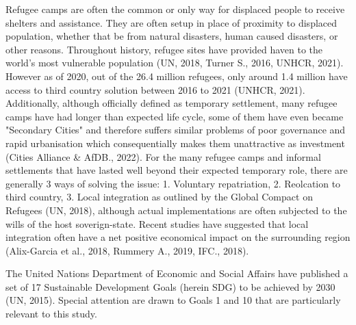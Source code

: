 \documentclass[11pt, a4paper, twoside]{report}
\begin{document}
Refugee camps are often the common or only way for displaced people to receive shelters and assistance. They are often setup in place of proximity to displaced population, whether that be from natural disasters, human caused disasters, or other reasons. Throughout history, refugee sites have provided haven to the world's most vulnerable population (UN, 2018, Turner S., 2016, UNHCR, 2021). However as of 2020, out of the 26.4 million refugees, only around 1.4 million have access to third country solution between 2016 to 2021 (UNHCR, 2021). Additionally, although officially defined as temporary settlement, many refugee camps have had longer than expected life cycle, some of them have even became "Secondary Cities" and therefore suffers similar problems of poor governance and rapid urbanisation which consequentially makes them unattractive as investment (Cities Alliance \& AfDB., 2022). For the many refugee camps and informal settlements that have lasted well beyond their expected temporary role, there are  generally 3 ways of solving the issue: 1. Voluntary repatriation, 2. Reolcation to third country, 3. Local integration as outlined by the Global Compact on Refugees (UN, 2018), although actual implementations are often subjected to the wills of the host soverign-state. Recent studies have suggested that local integration often have a net positive economical impact on the surrounding region (Alix-Garcia et al., 2018, Rummery A., 2019, IFC., 2018). \\\par

The United Nations Department of Economic and Social Affairs have published a set of 17 Sustainable Development Goals (herein SDG) to be achieved by 2030 (UN, 2015). Special attention are drawn to Goals 1 and 10 that are particularly relevant to this study.\\\par
\end{document}
